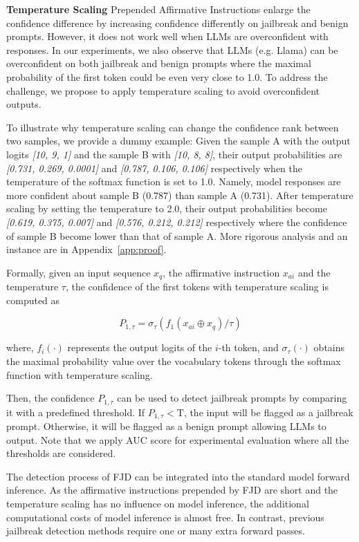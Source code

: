 \documentclass{article}
\begin{document}
\textbf{Temperature Scaling} Prepended Affirmative Instructions enlarge the confidence difference by increasing confidence differently on jailbreak and benign prompts. However, it does not work well when LLMs are overconfident with responses. In our experiments, we also observe that LLMs (e.g. Llama) can be overconfident on both jailbreak and benign prompts where the maximal probability of the first token could be even very close to 1.0. To address the challenge, we propose to apply temperature scaling to avoid overconfident outputs.

To illustrate why temperature scaling can change the confidence rank between two samples, we provide a dummy example: Given the sample A with the output logits \textit{[10, 9, 1]} and the sample B with \textit{[10, 8, 8]}, their output probabilities are \textit{[0.731, 0.269, 0.0001]} and \textit{[0.787, 0.106, 0.106]} respectively when the temperature of the softmax function is set to 1.0. Namely, model responses are more confident about sample B (0.787) than sample A (0.731). After temperature scaling by setting the temperature to 2.0, their output probabilities become \textit{[0.619, 0.375, 0.007]} and \textit{[0.576, 0.212, 0.212]} respectively where the confidence of sample B become lower than that of sample A. More rigorous analysis and an instance are in Appendix~\ref{app:proof}.

Formally, given an input sequence $ x_q $, the affirmative instruction $x_{ai}$ and the temperature $\tau$, the confidence of the first tokens with temperature scaling is computed as


\begin{equation}
    \label{c0}
    P_{1,\tau}=\sigma_\tau(f_{1}(x_{ai}\oplus x_q)/\tau)
\end{equation} 

where, $f_i(\cdot)$ represents the output logits of the $i$-th token, and $\sigma_\tau(\cdot)$ obtains the maximal probability value over the vocabulary tokens through the softmax function with temperature scaling.

Then, the confidence $P_{1,\tau}$ can be used to detect jailbreak prompts by comparing it with a predefined threshold. If $P_{1,\tau} < \mathrm{T}$, the input will be flagged as a jailbreak prompt. Otherwise, it will be flagged as a benign prompt allowing LLMs to output. Note that we apply AUC score for experimental evaluation where all the thresholds are considered.

The detection process of FJD can be integrated into the standard model forward inference. As the affirmative instructions prepended by FJD are short and the temperature scaling has no influence on model inference, the additional computational costs of model inference is almost free. In contrast, previous jailbreak detection methods require one or many extra forward passes.
\end{document}
